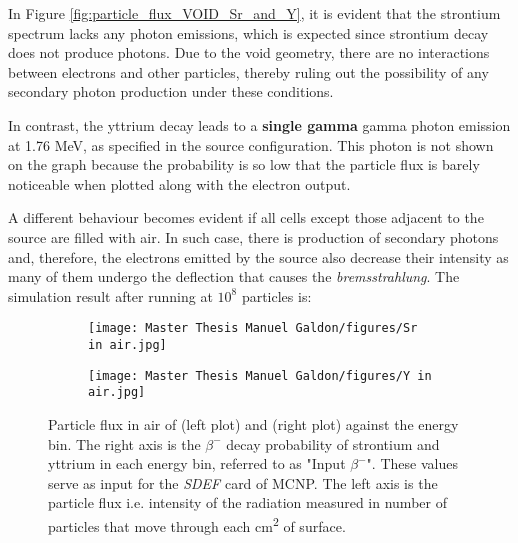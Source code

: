 In Figure \ref{fig:particle_flux_VOID_Sr_and_Y}, it is evident that the strontium spectrum lacks any photon emissions, which is expected since strontium decay does not produce photons. Due to the void geometry, there are no interactions between electrons and other particles, thereby ruling out the possibility of any secondary photon production under these conditions.

In contrast, the yttrium decay leads to a \textbf{single gamma} gamma photon emission at 1.76 \unit{\mega\electronvolt}, as specified in the source configuration. This photon is not shown on the graph because the probability is so low that the particle flux is barely noticeable when plotted along with the electron output.

A different behaviour becomes evident if all cells except those adjacent to the source are filled with air. In such case, there is production of secondary photons and, therefore, the electrons emitted by the source also decrease their intensity as many of them undergo the deflection that causes the \emph{bremsstrahlung}. 
\clearpage
The simulation result after running at $10^8$ particles is:

\begin{figure}[!h]
    \begin{subfigure}{7 cm}
        \texttt{[image: Master Thesis Manuel Galdon/figures/Sr in air.jpg]} 
        \label{fig:Sr-90_air}
    \end{subfigure}
    \hspace{1cm}
    \begin{subfigure}{1 cm}
        \texttt{[image: Master Thesis Manuel Galdon/figures/Y in air.jpg]}
        \label{fig:Y-90_air}
    \end{subfigure}
    \caption{Particle flux in air of  (left plot) and  (right plot) against the energy bin. The right axis is the $\beta^-$ decay probability of strontium and yttrium in each energy bin, referred to as "Input $\beta^-$". These values serve as input for the \emph{SDEF} card of MCNP. The left axis is the particle flux i.e. intensity of the radiation measured in number of particles that move through each \unit{\square\centi\meter} of surface.}
    \label{fig:particle_flux_air_Sr_and_Y}
\end{figure}



